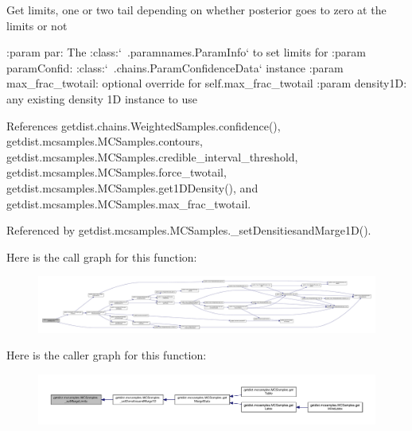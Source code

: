 \begin{DoxyVerb}Get limits, one or two tail depending on whether posterior
goes to zero at the limits or not

:param par:  The :class:`~.paramnames.ParamInfo` to set limits for
:param paramConfid: :class:`~.chains.ParamConfidenceData` instance
:param max_frac_twotail: optional override for self.max_frac_twotail
:param density1D: any existing density 1D instance to use
\end{DoxyVerb}
 

References getdist.\+chains.\+Weighted\+Samples.\+confidence(), getdist.\+mcsamples.\+M\+C\+Samples.\+contours, getdist.\+mcsamples.\+M\+C\+Samples.\+credible\+\_\+interval\+\_\+threshold, getdist.\+mcsamples.\+M\+C\+Samples.\+force\+\_\+twotail, getdist.\+mcsamples.\+M\+C\+Samples.\+get1\+D\+Density(), and getdist.\+mcsamples.\+M\+C\+Samples.\+max\+\_\+frac\+\_\+twotail.



Referenced by getdist.\+mcsamples.\+M\+C\+Samples.\+\_\+set\+Densitiesand\+Marge1\+D().

Here is the call graph for this function\+:
\nopagebreak
\begin{figure}[H]
\begin{center}
\leavevmode
\includegraphics[width=350pt]{classgetdist_1_1mcsamples_1_1MCSamples_a90a8cf01a23a304a6e5fe07db7a74e1a_cgraph}
\end{center}
\end{figure}
Here is the caller graph for this function\+:
\nopagebreak
\begin{figure}[H]
\begin{center}
\leavevmode
\includegraphics[width=350pt]{classgetdist_1_1mcsamples_1_1MCSamples_a90a8cf01a23a304a6e5fe07db7a74e1a_icgraph}
\end{center}
\end{figure}
\mbox{\label{classgetdist_1_1mcsamples_1_1MCSamples_a07f58b45eeec904f47f0f7f47324c5d0}} 
